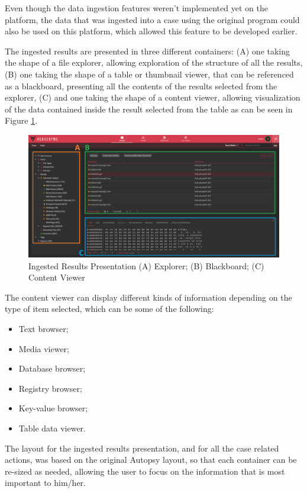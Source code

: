 Even though the data ingestion features weren't implemented yet on the platform, the data that was ingested into a case using the original program could also be used on this platform, which allowed this feature to be developed earlier.

The ingested results are presented in three different containers: (A) one taking the shape of a file explorer, allowing exploration of the structure of all the results, 
(B) one taking the shape of a table or thumbnail viewer, that can be referenced as a blackboard, presenting all the contents of the results selected from the explorer, (C) and one taking the shape of a content viewer, allowing visualization
of the data contained inside the result selected from the table as can be seen in Figure \ref{fig:data}.

\pagebreak

\begin{figure}[ht]
 \centering
 \includegraphics[width=1\linewidth]{imgs/data.png}
 \caption{Ingested Results Presentation (A) Explorer; (B) Blackboard; (C) Content Viewer}
 \label{fig:data}
\end{figure}

The content viewer can display different kinds of information depending on the type of item selected, which can be some of the following:
\begin{itemize}
 \item Text browser;
 \item Media viewer;
 \item Database browser;
 \item Registry browser;
 \item Key-value browser;
 \item Table data viewer.
\end{itemize}

The layout for the ingested results presentation, and for all the case related actions, was based on the original Autopsy layout, so that each container can be re-sized as
needed, allowing the user to focus on the information that is most important to him/her.

